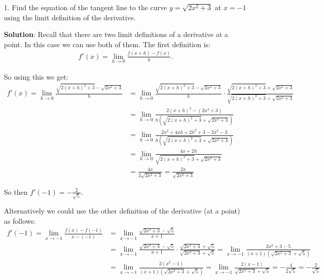 \documentclass[11pt,reqno]{article}
\theoremstyle{definition}
\begin{document}
	\begin{enumerate}
		\item[1.] Find the equation of the tangent line to the curve $y = \sqrt{2x^2 + 3}$ at $x = -1$ using the limit definition of the derivative. 
		
		\textbf{Solution}: Recall that there are two limit definitions of a derivative at a point. In this case we can use both of them. The first definition is: 
		\begin{align*}
			f'(x) = \lim\limits_{h \to 0} \frac{f(x + h) - f(x)}{h}.
		\end{align*}
		
		So using this we get: 
		\begin{align*}
			f'(x) = \lim\limits_{h \to 0} \frac{\sqrt{2 (x + h)^2 + 3} - \sqrt{2x^2 + 3}}{h} &= \lim\limits_{h \to 0} \frac{\sqrt{2 (x + h)^2 + 3} - \sqrt{2x^2 + 3}}{h} \cdot \frac{\sqrt{2 (x + h)^2 + 3} + \sqrt{2x^2 + 3}}{\sqrt{2 (x + h)^2 + 3} + \sqrt{2x^2 + 3}} \\
			&= \lim\limits_{h \to 0} \frac{2(x+h)^2 - (2x^2 + 3)}{ h (\sqrt{2 (x + h)^2 + 3} + \sqrt{2x^2 + 3})} \\
			&= \lim\limits_{h \to 0} \frac{2x^2 + 4xh + 2h^2 +3 - 2x^2 - 3}{h (\sqrt{2 (x + h)^2 + 3} + \sqrt{2x^2 + 3})} \\
			&= \lim\limits_{h \to 0} \frac{4x + 2h}{\sqrt{2 (x + h)^2 + 3} + \sqrt{2x^2 + 3}} \\
			&= \frac{4x}{2 \sqrt{2x^2 + 3}} = \frac{2x}{\sqrt{2x^2 + 3}}
		\end{align*}
		
		So then $f'(-1) = -\frac{2}{\sqrt{5}}$.
		
		Alternatively we could use the other definition of the derivative (at a point) as follows:
		\begin{align*}
			f'(-1) = \lim\limits_{x \to -1} \frac{f(x) - f(-1)}{x - (-1)} &= \lim\limits_{x \to -1} \frac{\sqrt{2x^2 + 3} - \sqrt{5}}{x + 1} \\
			&= \lim\limits_{x \to -1} \frac{\sqrt{2x^2 + 3} - \sqrt{5}}{x + 1} \cdot \frac{\sqrt{2 x^2 + 3} + \sqrt{5}}{\sqrt{2x^2 + 3} + \sqrt{5}} = \lim\limits_{x \to -1}\frac{2x^2 + 3 - 5}{(x + 1)(\sqrt{2x^2 + 3} + \sqrt{5})} \\
			&= \lim\limits_{x \to -1} \frac{2(x^2 - 1)}{(x + 1)(\sqrt{2x^2 + 3} + \sqrt{5})} = \lim\limits_{x \to -1} \frac{2(x - 1)}{\sqrt{2x^2 + 3} + \sqrt{5}} = - \frac{4}{2\sqrt{5}} = - \frac{2}{\sqrt{5}}
		\end{align*}
		

\end{enumerate}
\end{document}
